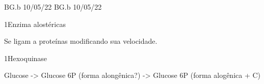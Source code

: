 \documentclass[\mainfilename]{subfiles}
\begin{document}
{BG.b 10/05/22}
{BG.b 10/05/22}

\begin{sectionBox}1{Enzima alostéricas}
    
    Se ligam a proteínas modificando sua velocidade.
    
\end{sectionBox}

\begin{sectionBox}1{Hexoquinase}
    
    Glucose -> Glucose 6P (forma alongênica?) -> Glucose 6P (forma alogênica + C)
    
\end{sectionBox}
\end{document}
